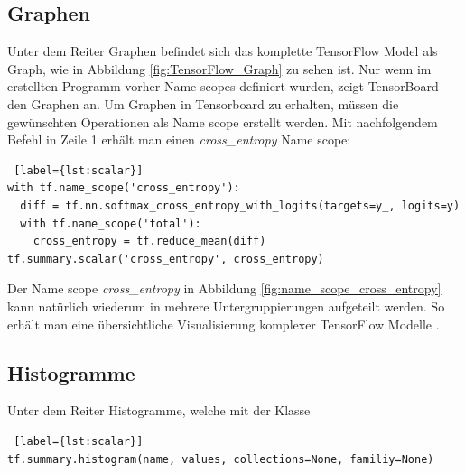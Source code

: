 \subsection{Graphen} \label{sub:tb-graph}
\vspace{10pt}
Unter dem Reiter Graphen befindet sich das komplette TensorFlow Model als Graph,  wie in Abbildung \ref{fig:TensorFlow_Graph} zu sehen ist. Nur wenn im erstellten Programm vorher Name scopes definiert wurden, zeigt TensorBoard den Graphen an. Um Graphen in Tensorboard zu erhalten, müssen die gewünschten Operationen als Name scope erstellt werden. Mit nachfolgendem Befehl in Zeile 1 erhält man einen \textit{cross\_entropy} Name scope: 
\\

\begin{minipage}{\linewidth}
\begin{lstlisting} [label={lst:scalar}]
with tf.name_scope('cross_entropy'):
  diff = tf.nn.softmax_cross_entropy_with_logits(targets=y_, logits=y)
  with tf.name_scope('total'):
    cross_entropy = tf.reduce_mean(diff)
tf.summary.scalar('cross_entropy', cross_entropy)
\end{lstlisting}
\end{minipage}
\vspace{0.2cm}

Der Name scope \textit{cross\_entropy} in Abbildung \ref{fig:name_scope_cross_entropy} kann natürlich wiederum in mehrere Untergruppierungen aufgeteilt werden. So erhält man eine übersichtliche Visualisierung komplexer TensorFlow Modelle \cite{tensorboard.2017}.






\subsection{Histogramme}
\vspace{10pt}
Unter dem Reiter Histogramme, welche mit der Klasse
\\

\begin{minipage}{\linewidth}
\begin{lstlisting} [label={lst:scalar}]
tf.summary.histogram(name, values, collections=None, familiy=None)
\end{lstlisting}
\end{minipage}
\vspace{0.2cm}


